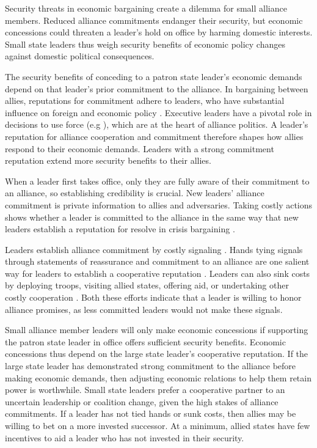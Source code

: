 \documentclass[12pt]{article}
\begin{document}
Security threats in economic bargaining create a dilemma for small alliance members. 
Reduced alliance commitments endanger their security, but economic concessions could threaten a leader's hold on office by harming domestic interests. 
Small state leaders thus weigh security benefits of economic policy changes against domestic political consequences.


The security benefits of conceding to a patron state leader's economic demands depend on that leader's prior commitment to the alliance. 
In bargaining between allies, reputations for commitment adhere to leaders, who have substantial influence on foreign and economic policy \citep{Renshonetal2018}.
Executive leaders have a pivotal role in decisions to use force (e.g \citep{Colgan2013, ColganWeeks2015}), which are at the heart of alliance politics.
A leader's reputation for alliance cooperation and commitment therefore shapes how allies respond to their economic demands. 
Leaders with a strong commitment reputation extend more security benefits to their allies. 


When a leader first takes office, only they are fully aware of their commitment to an alliance, so establishing credibility is crucial. 
New leaders' alliance commitment is private information to allies and adversaries. 
Taking costly actions shows whether a leader is committed to the alliance in the same way that new leaders establish a reputation for resolve in crisis bargaining \citep{Wolford2007}. 


Leaders establish alliance commitment by costly signaling \citep{Fearon1997}. 
Hands tying signals through statements of reassurance and commitment to an alliance are one salient way for leaders to establish a cooperative reputation \citep{Blankenship2020}.
Leaders can also sink costs by deploying troops, visiting allied states, offering aid, or undertaking other costly cooperation \citep{McManusNieman2019}.
Both these efforts indicate that a leader is willing to honor alliance promises, as less committed leaders would not make these signals.


Small alliance member leaders will only make economic concessions if supporting the patron state leader in office offers sufficient security benefits. 
Economic concessions thus depend on the large state leader's cooperative reputation. 
If the large state leader has demonstrated strong commitment to the alliance before making economic demands, then adjusting economic relations to help them retain power is worthwhile.
Small state leaders prefer a cooperative partner to an uncertain leadership or coalition change, given the high stakes of alliance commitments.
If a leader has not tied hands or sunk costs, then allies may be willing to bet on a more invested successor. 
At a minimum, allied states have few incentives to aid a leader who has not invested in their security. 
\end{document}
